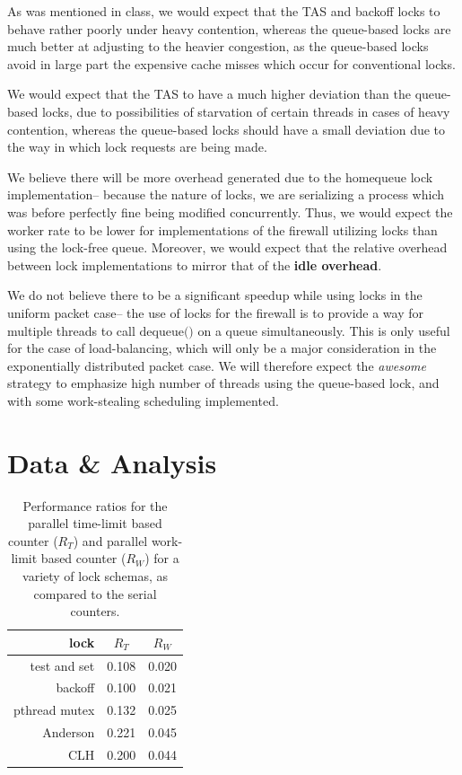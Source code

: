 \documentclass{article}
\newcommand{\ti}[1]{\emph{#1}}
\newcommand{\tb}[1]{\textbf{#1}}
\newcommand{\cpart}[1]{\newblock{\LARGE {\\\\#1}}}
\newcommand{\code}[1]{\texttt{$\text{#1}$}}
\begin{document}
\cpart{Lock Scaling}

As was mentioned in class, we would expect that the TAS and backoff locks to behave rather poorly under heavy contention, whereas the queue-based locks are much 
better at adjusting to the heavier congestion, as the queue-based locks avoid in large part the expensive cache misses which occur for conventional locks.

\cpart{Fairness}

We would expect that the TAS to have a much higher deviation than the queue-based locks, due to possibilities of starvation of certain threads in cases of heavy 
contention, whereas the queue-based locks should have a small deviation due to the way in which lock requests are being made.

\cpart{Packet Overhead}

We believe there will be more overhead generated due to the homequeue lock implementation-- because the nature of locks, we are serializing a process which was 
before perfectly fine being modified concurrently. Thus, we would expect the worker rate to be lower for implementations of the firewall utilizing locks than using 
the lock-free queue. Moreover, we would expect that the relative overhead between lock implementations to mirror that of the \tb{idle overhead}.

\cpart{Packet Scaling}

We do not believe there to be a significant speedup while using locks in the uniform packet case-- the use of locks for the firewall is to provide a way for 
multiple threads to call \code{dequeue()} on a queue simultaneously. This is only useful for the case of load-balancing, which will only be a major consideration in 
the exponentially distributed packet case. We will therefore expect the \ti{awesome} strategy to emphasize high number of threads using the queue-based lock, and 
with some work-stealing scheduling implemented.

\section{Data \& Analysis}

\cpart{Idle Overhead}

\begin{table}
\begin{center}
	\begin{tabular}{ r | c c }
		lock		&	$R_T$	&	$R_W$	\\
		\hline
		test and set	&	0.108	&	0.020	\\
		backoff		&	0.100	&	0.021	\\
		pthread mutex	&	0.132	&	0.025	\\
		Anderson	&	0.221	&	0.045	\\
		CLH		&	0.200	&	0.044	\\
	\end{tabular}
\end{center}
\caption{Performance ratios for the parallel time-limit based counter ($R_T$) and parallel work-limit based counter ($R_W$) for a variety of lock schemas, as compared to the serial counters.}
\label{idle_table}
\end{table}
\end{document}

